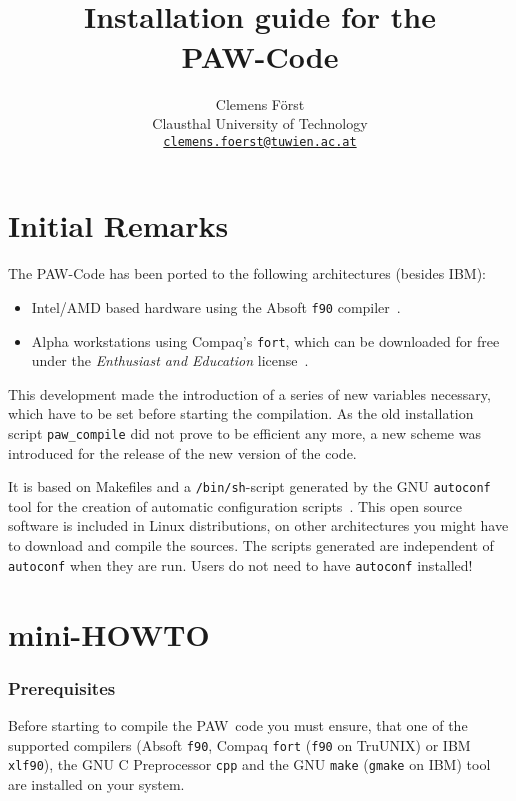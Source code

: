 \documentclass[a4paper,10pt]{article}
\title{\hrulefill \\ {\Large \bf Installation guide for the \\} 
                  {\Huge \bf PAW-Code} \\ \vspace*{-0.3cm} \hrulefill}
\author{\small  Clemens F\"orst \\ 
        \small Clausthal University of Technology \\ 
        \small \underline{\texttt{clemens.foerst@tuwien.ac.at}}}
\date{}
\newcommand{\PAW}{\textsc{PAW}}
\begin{document}
\maketitle
\tableofcontents

\section{Initial Remarks}

The \textsc{PAW}-Code has been ported to the following architectures (besides IBM):
\begin{itemize}
  \item Intel/AMD based hardware using the Absoft \texttt{f90} compiler~\cite{f90}.
  \item Alpha workstations using Compaq's \texttt{fort}, which can be downloaded for free under the 
        \textit{Enthusiast and Education} license~\cite{fort}.
\end{itemize}
This development made the introduction of a series of new variables necessary, which have to be set
before starting the compilation.  As the old installation script
\texttt{paw\_compile} did not prove to be efficient any more, a new scheme was introduced for the release of the new version of the code.

It is based on Makefiles and a \texttt{/bin/sh}-script generated by the GNU \texttt{autoconf} tool for the creation of automatic
configuration scripts~\cite{autoconf,autoconf2}.  This open source software is
included in Linux distributions, on other architectures you might have to
download and compile the sources.  The scripts generated are independent of \texttt{autoconf} when
they are run. Users do not need to have \texttt{autoconf} installed!


\section{mini-HOWTO}

\subsubsection*{Prerequisites}

Before starting to compile the \PAW\ code you must ensure, that one of the
supported compilers (Absoft \texttt{f90}, Compaq \texttt{fort} (\texttt{f90} on TruUNIX) or IBM
\texttt{xlf90}), the GNU C Preprocessor \texttt{cpp} and the GNU \texttt{make}
(\texttt{gmake} on IBM) tool~\cite{make} are installed on your system.
\end{document}
